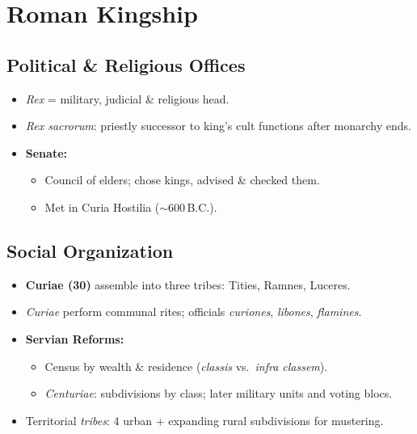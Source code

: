 \documentclass[11pt,a4paper]{article}
\begin{document}
\section{Roman Kingship}
\subsection{Political \& Religious Offices}
\begin{itemize}
  \item \textit{Rex} = military, judicial \& religious head.
  \item \textit{Rex sacrorum}: priestly successor to king’s cult functions after monarchy ends.
  \item \textbf{Senate:}  
    \begin{itemize}
      \item Council of elders; chose kings, advised \& checked them.
      \item Met in Curia Hostilia (\(\sim\)600\,B.C.).
    \end{itemize}
\end{itemize}

\subsection{Social Organization}
\begin{itemize}
  \item \textbf{Curiae (30)} assemble into three tribes: Tities, Ramnes, Luceres.
  \item \textit{Curiae} perform communal rites; officials \textit{curiones}, \textit{libones}, \textit{flamines}.
  \item \textbf{Servian Reforms:}
    \begin{itemize}
      \item Census by wealth \& residence (\textit{classis} vs.\ \textit{infra classem}).
      \item \textit{Centuriae}: subdivisions by class; later military units and voting blocs.
    \end{itemize}
  \item Territorial \textit{tribes}: 4 urban + expanding rural subdivisions for mustering.
\end{itemize}
\end{document}

